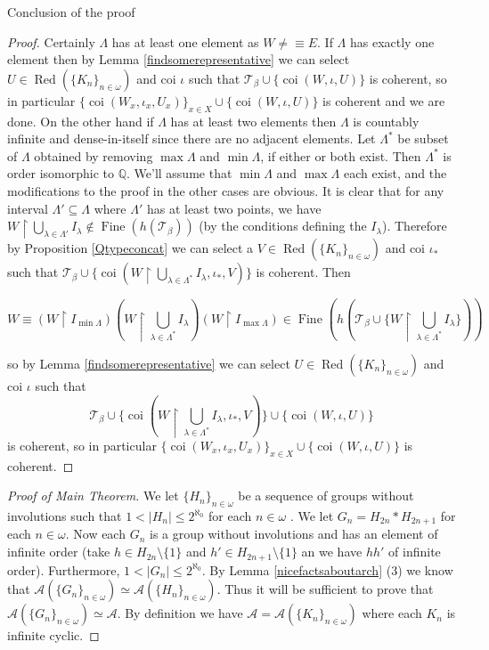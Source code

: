 \documentclass{amsart}
\theoremstyle{definition}\newtheorem{theorem}{Theorem}
\theoremstyle{definition}\newtheorem*{A}{Main Theorem}
\theoremstyle{definition}\newtheorem*{B}{Theorem \ref{elementaryequiv}}
\theoremstyle{definition}\newtheorem*{C}{Theorem \ref{continuous}}
\theoremstyle{definition}\newtheorem*{D}{Theorem \ref{bigisomorphism2}}
\theoremstyle{definition}\newtheorem{bigtheorem}{Main Theorem}
\numberwithin{theorem}{section}
\theoremstyle{definition}\newtheorem{corollary}[theorem]{Corollary}
\theoremstyle{definition}\newtheorem{proposition}[theorem]{Proposition}
\theoremstyle{definition}\newtheorem{definition}[theorem]{Definition}
\theoremstyle{definition}\newtheorem{question}[theorem]{Question}
\theoremstyle{definition}\newtheorem{example}[theorem]{Example}
\theoremstyle{definition}\newtheorem{remark}[theorem]{Remark}
\theoremstyle{definition}\newtheorem{note}[theorem]{Note}
\theoremstyle{definition}\newtheorem{lemma}[theorem]{Lemma}
\theoremstyle{definition}\newtheorem{fact}[theorem]{Fact}
\theoremstyle{definition}\newtheorem{define}[theorem]{Definition}
\theoremstyle{definition}\newtheorem{claim}[theorem]{Claim}
\theoremstyle{definition}\newtheorem{obs}[theorem]{Observation}
\theoremstyle{definition}\newtheorem{definitions}[theorem]{Definitions}
\newcommand{\Red}{\operatorname{Red}}
\newcommand{\Fine}{\operatorname{Fine}}
\newcommand{\coi}{\operatorname{coi}}
\begin{document}
\begin{section}{Conclusion of the proof}
\begin{proof}
Certainly $\Lambda$ has at least one element as $W \neq\equiv E$.  If $\Lambda$ has exactly one element then by Lemma \ref{findsomerepresentative} we can select $U \in \Red(\{K_n\}_{n \in \omega})$ and coi $\iota$ such that $\mathcal{T}_{\beta} \cup \{\coi(W, \iota, U)\}$ is coherent, so in particular $\{\coi(W_x, \iota_x, U_x)\}_{x \in X} \cup \{\coi(W, \iota, U)\}$ is coherent and we are done.  On the other hand if $\Lambda$ has at least two elements then $\Lambda$ is countably infinite and dense-in-itself since there are no adjacent elements.  Let $\Lambda^*$ be subset of $\Lambda$ obtained by removing $\max\Lambda$ and $\min\Lambda$, if either or both exist.  Then $\Lambda^*$ is order isomorphic to $\mathbb{Q}$.  We'll assume that $\min\Lambda$ and $\max\Lambda$ each exist, and the modifications to the proof in the other cases are obvious.  It is clear that for any interval $\Lambda' \subseteq \Lambda$ where $\Lambda'$ has at least two points, we have $W \upharpoonright \bigcup_{\lambda \in \Lambda'} I_{\lambda} \notin \Fine(h(\mathcal{T}_{\beta}))$ (by the conditions defining the $I_{\lambda}$).  Therefore by Proposition \ref{Qtypeconcat} we can select a $V \in \Red(\{K_n\}_{n \in \omega})$ and coi $\iota_*$ such that $\mathcal{T}_{\beta} \cup \{\coi(W\upharpoonright \bigcup_{\lambda \in \Lambda^*} I_{\lambda}, \iota_*, V)\}$ is coherent.  Then


$$W \equiv (W\upharpoonright I_{\min\Lambda})(W\upharpoonright \bigcup_{\lambda \in \Lambda^*} I_{\lambda})(W\upharpoonright I_{\max\Lambda}) \in \Fine(h(\mathcal{T}_{\beta} \cup \{W\upharpoonright \bigcup_{\lambda \in \Lambda^*} I_{\lambda}\}))$$


\noindent so by Lemma \ref{findsomerepresentative} we can select $U \in \Red(\{K_n\}_{n \in \omega})$ and coi $\iota$ such that $$\mathcal{T}_{\beta} \cup \{\coi(W\upharpoonright \bigcup_{\lambda \in \Lambda^*} I_{\lambda}, \iota_*, V)\} \cup \{\coi(W, \iota, U)\}$$ is coherent, so in particular $\{\coi(W_x, \iota_x, U_x)\}_{x \in X} \cup \{\coi(W, \iota, U)\}$ is coherent.

\end{proof}

\begin{proof}[Proof of Main Theorem]  We let $\{H_n\}_{n \in \omega}$ be a sequence of groups without involutions such that $1 < |H_n| \leq 2^{\aleph_0}$ for each $n \in \omega$ .  We let $G_n = H_{2n} * H_{2n+1}$ for each $n \in \omega$.  Now each $G_n$ is a group without involutions and has an element of infinite order (take $h \in H_{2n}\setminus \{1\}$ and $h' \in H_{2n+1} \setminus \{1\}$ an we have $hh'$ of infinite order).  Furthermore, $1 < |G_n| \leq 2^{\aleph_0}$.  By Lemma \ref{nicefactsaboutarch} (3) we know that $\mathcal{A}(\{G_n\}_{n \in \omega}) \simeq \mathcal{A}(\{H_n\}_{n \in \omega})$.  Thus it will be sufficient to prove that $\mathcal{A}(\{G_n\}_{n \in \omega}) \simeq \mathcal{A}$.  By definition we have $\mathcal{A} = \mathcal{A}(\{K_n\}_{n \in \omega})$ where each $K_n$ is infinite cyclic.


\end{proof}
\end{section}
\end{document}
